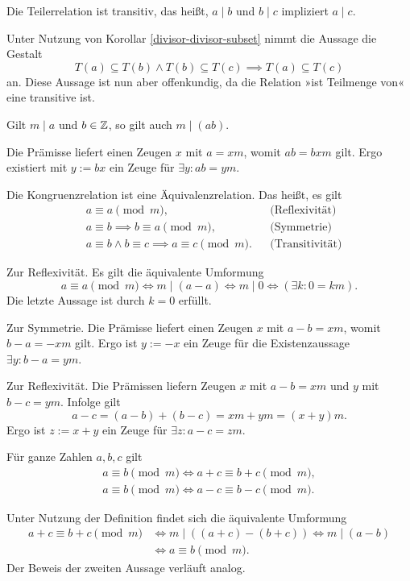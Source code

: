 \begin{Korollar}
Die Teilerrelation ist transitiv, das heißt,
$a\mid b$ und $b\mid c$ impliziert $a\mid c$.
\end{Korollar}
\begin{Beweis}
Unter Nutzung von Korollar \ref{divisor-divisor-subset}
nimmt die Aussage die Gestalt
\[T(a)\subseteq T(b)\land T(b)\subseteq T(c)\implies T(a)\subseteq T(c)\]
an. Diese Aussage ist nun aber offenkundig, da die Relation »ist
Teilmenge von« eine transitive ist.\,\qedsymbol
\end{Beweis}

\begin{Korollar}\label{divides-weaken}
Gilt $m\mid a$ und $b\in\mathbb Z$, so gilt auch $m\mid (ab)$.
\end{Korollar}
\begin{Beweis}
Die Prämisse liefert einen Zeugen $x$ mit $a=xm$, womit $ab=bxm$
gilt. Ergo existiert mit $y:=bx$ ein Zeuge für
$\exists y\colon ab=ym$.\,\qedsymbol
\end{Beweis}

\begin{Korollar}
Die Kongruenzrelation ist eine Äquivalenzrelation. Das heißt, es gilt
\begin{align*}
& a\equiv a\pmod m, && \text{(Reflexivität)}\\
& a\equiv b \implies b\equiv a\pmod m, && \text{(Symmetrie)}\\
& a\equiv b\land b\equiv c\implies a\equiv c\pmod m. && \text{(Transitivität)}
\end{align*}
\end{Korollar}
\begin{Beweis}
Zur Reflexivität. Es gilt die äquivalente Umformung
\[a\equiv a\pmod m \iff m\mid (a-a) \iff m\mid 0\iff (\exists k\colon 0 = km).\]
Die letzte Aussage ist durch $k=0$ erfüllt.

Zur Symmetrie. Die Prämisse liefert einen Zeugen $x$ mit $a-b = xm$,
womit $b-a = -xm$ gilt. Ergo ist $y:=-x$ ein Zeuge für die
Existenzaussage $\exists y\colon b-a = ym$.

Zur Reflexivität. Die Prämissen liefern Zeugen $x$ mit $a-b=xm$
und $y$ mit $b-c=ym$. Infolge gilt
\[a-c = (a-b) + (b-c) = xm + ym = (x+y)m.\]
Ergo ist $z:=x+y$ ein Zeuge für $\exists z\colon a-c = zm$.\,\qedsymbol
\end{Beweis}

\begin{Korollar}\label{cong-shift}
Für ganze Zahlen $a,b,c$ gilt
\begin{gather*}
a\equiv b\pmod m \iff a+c\equiv b+c \pmod m,\\
a\equiv b\pmod m \iff a-c\equiv b-c \pmod m.
\end{gather*}
\end{Korollar}
\begin{Beweis}
Unter Nutzung der Definition findet sich die äquivalente Umformung
\begin{align*}
a+c\equiv b+c\pmod m &\iff m\mid ((a+c)-(b+c))
\iff m\mid (a-b)\\
&\iff a\equiv b\pmod m.
\end{align*}
Der Beweis der zweiten Aussage verläuft analog.\,\qedsymbol
\end{Beweis}


